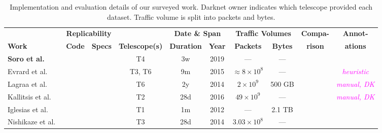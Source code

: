 \documentclass[manuscript,nonacm]{acmart}
\newcommand{\cmark}{\ding{51}}%
\newcommand{\xmark}{\ding{55}}%
\newcommand{\wc}[1]{\textit{\textcolor{magenta}{#1}}} %
\begin{document}
\begin{table*}[h!]
	\small
	\setlength{\tabcolsep}{4pt}
	\caption{Implementation and evaluation details of our surveyed work. Darknet owner indicates which telescope provided each dataset. Traffic volume is split into packets and bytes.}
	\label{tab:eval}
	\begin{tabular}{@{}lccccccccc@{}}
		\toprule
		& \multicolumn{2}{c}{\bf Replicability}			 &  & \multicolumn{2}{c}{\bf Date \& Span} & \multicolumn{2}{c}{\bf Traffic Volumes} &\textbf{Compa-}&\textbf{Annot-}\\
		\textbf{Work} & \textbf{Code} & \textbf{Specs} & \textbf{Telescope(s)} & \textbf{Duration} & \textbf{Year} 
		& \textbf{Packets} & \textbf{Bytes} & \textbf{rison} & \textbf{ations} \\
		\midrule
		\textbf{Soro et al.~\cite{2020soro}}                   
		& \xmark & \xmark           
		& T4            
		& 3w    & 2019    
		& ---                  
		& ---              
		& \xmark            
		& \xmark          \\
		
		Evrard et al.~\cite{2019evrard}                        
		& \xmark & \xmark           
		& T3, T6  
		& 9m    & 2015    
		& ${\approx}8\times10^{8}$ 
		& ---              
		& \xmark            
		& \wc{heuristic}  \\
		
		Lagraa et al.~\cite{2017lagraa,2019lagraa}             
		& \xmark & \cmark           
		& T6          
		& 2y    & 2014    
		& $2\times10^{9}$ 
		& 500 GB        
		& \xmark            
		& \wc{manual, DK}\\
		
		Kallitsis et al.~\cite{2022kallitsis}                  
		& \cmark & \cmark           
		& T2
		& 28d   & 2016    
		& $49\times10^{9}$
		& ---              
		& \cmark~\cite{2021gioacchini} 
		& \wc{manual, DK}\\
		
		Iglesias et al.~\cite{2019iglesias}                    
		& \xmark & \cmark           
		& T1
		& 1m    & 2012    
		& ---                  
		& 2.1 TB        
		& \xmark            
		& \xmark          \\
		
		Nishikaze et al.~\cite{2015nishikaze}                  
		& \xmark & \xmark           
		& T3         
		& 28d   & 2014    
		& $3.03\times10^{8}$
		& ---              
		& \xmark            
		& \xmark          \\
		

\end{tabular}
\end{table*}
\end{document}
